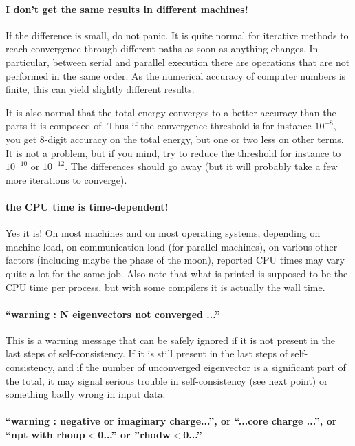 \documentclass[12pt,a4paper]{article}
\begin{document}
\paragraph{I don't get the same results in different machines!}

If the difference is small, do not panic. It is quite normal for iterative 
methods to reach convergence through different paths as soon as anything 
changes. In particular, between serial and parallel execution there are 
operations that are not performed in the same order. As the numerical 
accuracy of computer numbers is finite, this can yield slightly different 
results.

It is also normal that the total energy converges to a better accuracy 
than the parts it is composed of. Thus if the convergence threshold is 
for instance $10^{-8}$, you get 8-digit accuracy on the total energy, 
but one or two less on other terms. It is not a problem, but if you mind,
try to reduce the threshold for instance to $10^{-10}$ or $10^{-12}$.
The differences should go away (but it will probably take a few more 
iterations to converge).

\paragraph{the CPU time is time-dependent!}

Yes it is!
On most machines and on most operating systems, depending on machine
load, on communication load (for parallel machines), on various other
factors (including maybe the phase of the moon), reported CPU times
may vary quite a lot for the same job.
Also note that what is printed is supposed to be the CPU time per
process, but with some compilers it is actually the wall time.

\paragraph{``warning : N eigenvectors not converged ...''}

This is a warning message that can be safely ignored if it
is not present in the last steps of self-consistency. If it 
is still present in the last steps of self-consistency, and
if the number of unconverged eigenvector is a significant 
part of the total, it may signal serious trouble in self-consistency
(see next point) or something badly wrong in input data.

\paragraph{``warning : negative or imaginary charge...'', or
``...core charge ...'', or ``npt with rhoup$<$0...'' or ''rhodw$<$0...'' }
\end{document}
